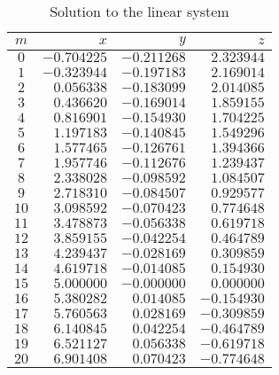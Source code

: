 \begin{table}[!hbtp]
\centering
\caption{Solution to the linear system}
\label{tab:solution}
\begin{tabular}{crrr}
\toprule
 $m$ &         $x$ &         $y$ &         $z$ \\
\midrule
$ 0$ & $-0.704225$ & $-0.211268$ & $ 2.323944$ \\
$ 1$ & $-0.323944$ & $-0.197183$ & $ 2.169014$ \\
$ 2$ & $ 0.056338$ & $-0.183099$ & $ 2.014085$ \\
$ 3$ & $ 0.436620$ & $-0.169014$ & $ 1.859155$ \\
$ 4$ & $ 0.816901$ & $-0.154930$ & $ 1.704225$ \\
$ 5$ & $ 1.197183$ & $-0.140845$ & $ 1.549296$ \\
$ 6$ & $ 1.577465$ & $-0.126761$ & $ 1.394366$ \\
$ 7$ & $ 1.957746$ & $-0.112676$ & $ 1.239437$ \\
$ 8$ & $ 2.338028$ & $-0.098592$ & $ 1.084507$ \\
$ 9$ & $ 2.718310$ & $-0.084507$ & $ 0.929577$ \\
$10$ & $ 3.098592$ & $-0.070423$ & $ 0.774648$ \\
$11$ & $ 3.478873$ & $-0.056338$ & $ 0.619718$ \\
$12$ & $ 3.859155$ & $-0.042254$ & $ 0.464789$ \\
$13$ & $ 4.239437$ & $-0.028169$ & $ 0.309859$ \\
$14$ & $ 4.619718$ & $-0.014085$ & $ 0.154930$ \\
$15$ & $ 5.000000$ & $-0.000000$ & $ 0.000000$ \\
$16$ & $ 5.380282$ & $ 0.014085$ & $-0.154930$ \\
$17$ & $ 5.760563$ & $ 0.028169$ & $-0.309859$ \\
$18$ & $ 6.140845$ & $ 0.042254$ & $-0.464789$ \\
$19$ & $ 6.521127$ & $ 0.056338$ & $-0.619718$ \\
$20$ & $ 6.901408$ & $ 0.070423$ & $-0.774648$ \\
\bottomrule
\end{tabular}
\end{table}

